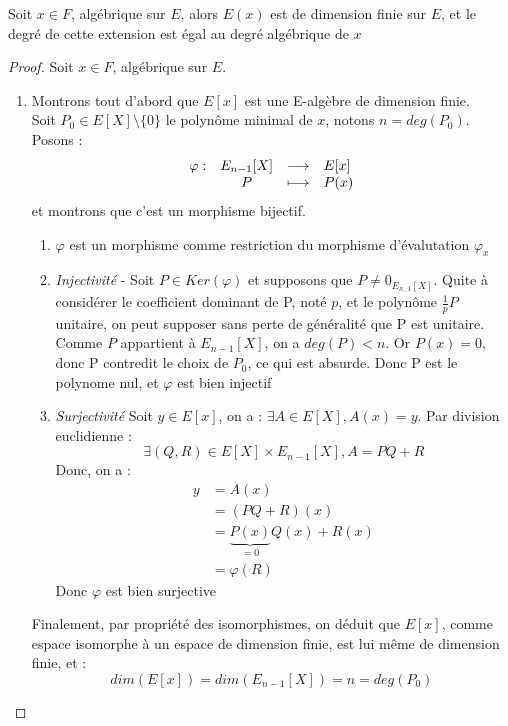 \documentclass[a4paper,12pt,french]{report}
\begin{document}
			\begin{proposition}
				Soit \(x \in F \), algébrique sur \(E\), alors \(E(x)\) est de dimension finie sur \(E\), et le degré de cette extension est égal au degré algébrique de \(x\){}
			\end{proposition}
				\begin{proof}
					Soit \(x \in F \), algébrique sur \(E\).{}
					
	\begin{enumerate}
		\item Montrons tout d'abord que $E[x]$ est une E-algèbre de dimension finie.\\ 
						Soit \(P_{0} \in E[X]\setminus\{0\} \) le polynôme minimal de $x$, notons \(n = deg(P_{0})\).
					Posons : 
					\[{}
						\begin{array}[t]{lccl}
							\varphi : 
							& E_{n-1}[X] & \longrightarrow & E[x] \\
							& P & \longmapsto & P(x)
						\end{array}
					\] et montrons que c'est un morphisme bijectif.
					
					\begin{enumerate}
						\item $\varphi$ est un morphisme comme restriction du morphisme d'évalutation $\varphi_{x}$
						\item \emph{Injectivité} - Soit \(P \in Ker(\varphi)\) et supposons que \(P \neq 0_{E_{{n_-1}}[X]} \). Quite à considérer le coefficient dominant de P, noté \(p\), et le polynôme \(\frac{1}{p}P\) unitaire, on peut supposer sans perte de généralité que P est unitaire. Comme \(P\) appartient à \(E_{n-1}[X]\), on a \(deg(P) < n\). Or \(P(x) = 0\), donc P contredit le choix de \(P_{0}\), ce qui est absurde. Donc P est le polynome nul, et \(\varphi\) est bien injectif
						
						\item \emph{Surjectivité}
						Soit $y \in E[x]$, on a : $\exists A \in E[X], A(x) = y$. Par division euclidienne : 
						\[{}
							\exists (Q,R) \in E[X] \times E_{n-1}[X] , A = PQ + R
						\]
						Donc, on a :
						\[{}
						\begin{aligned}
							y &= A(x) \\
							&= (PQ + R)(x)\\
							&=\underbrace{P(x)}_{=0}Q(x) + R(x)\\
							&=\varphi(R)
						\end{aligned}
						\]
						Donc $\varphi$ est bien surjective
					\end{enumerate}
				Finalement, par propriété des isomorphismes, on déduit que $E[x]$, comme espace isomorphe à un espace de dimension finie, est lui même de dimension finie, et :
				\[{}
				dim(E[x]) = dim(E_{n-1}[X]) = n = deg(P_{0})
				\]
		

\end{enumerate}
\end{proof}
\end{document}
